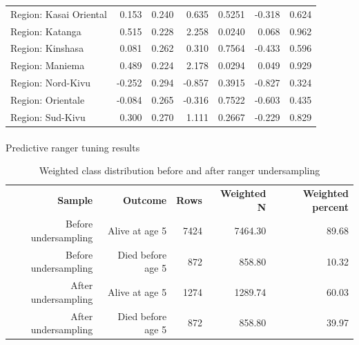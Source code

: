 \documentclass[
  11pt,
  a4paper,
]{article}
\makeatletter
\let\oldparagraph\paragraph
\renewcommand{\paragraph}{
    \@ifstar
      \xxxParagraphStar
      \xxxParagraphNoStar
  }
\newcommand{\xxxParagraphStar}[1]{\oldparagraph*{#1}\mbox{}}
\newcommand{\xxxParagraphNoStar}[1]{\oldparagraph{#1}\mbox{}}
\makeatother
\begin{document}
\begin{longtable}[t]{>{\raggedleft\arraybackslash}p{4.5cm}rrrrrr}
Region: Kasai Oriental & 0.153 & 0.240 & 0.635 & 0.5251 & -0.318 & 0.624\\
\addlinespace
Region: Katanga & 0.515 & 0.228 & 2.258 & 0.0240 & 0.068 & 0.962\\
Region: Kinshasa & 0.081 & 0.262 & 0.310 & 0.7564 & -0.433 & 0.596\\
Region: Maniema & 0.489 & 0.224 & 2.178 & 0.0294 & 0.049 & 0.929\\
Region: Nord-Kivu & -0.252 & 0.294 & -0.857 & 0.3915 & -0.827 & 0.324\\
Region: Orientale & -0.084 & 0.265 & -0.316 & 0.7522 & -0.603 & 0.435\\
\addlinespace
Region: Sud-Kivu & 0.300 & 0.270 & 1.111 & 0.2667 & -0.229 & 0.829\\
\bottomrule

\end{longtable}

\endgroup{}

\paragraph{Predictive ranger tuning
results}\label{predictive-ranger-tuning-results}

\begingroup\fontsize{11}{13}\selectfont

\begin{longtable}[t]{rrrrr}

\caption{\label{tbl-appendix-ranger-sampling-summary}Weighted class
distribution before and after ranger undersampling}

\tabularnewline

\\
\toprule
\textbf{Sample} & \textbf{Outcome} & \textbf{Rows} & \textbf{Weighted N} & \textbf{Weighted percent}\\
\midrule
Before undersampling & Alive at age 5 & 7424 & 7464.30 & 89.68\\
Before undersampling & Died before age 5 & 872 & 858.80 & 10.32\\
After undersampling & Alive at age 5 & 1274 & 1289.74 & 60.03\\
After undersampling & Died before age 5 & 872 & 858.80 & 39.97\\
\bottomrule

\end{longtable}

\endgroup{}

\begingroup\fontsize{11}{13}\selectfont
\end{document}
